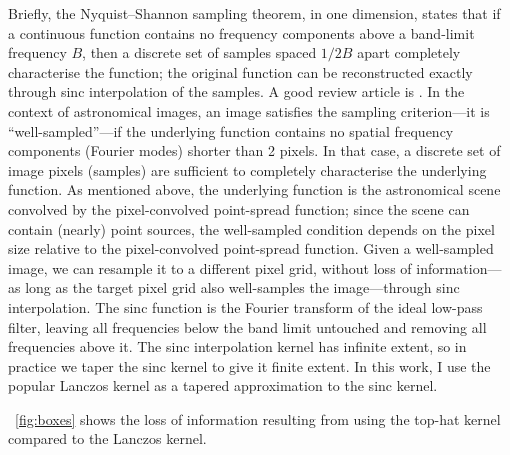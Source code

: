 \documentclass[11pt,preprint]{aastex}
\newcommand{\figref}[1]{\figurename~\ref{#1}}
\newcommand{\Figref}[1]{\figref{#1}}
\begin{document}
Briefly, the Nyquist--Shannon sampling theorem, in one dimension,
states that if a continuous function contains no frequency components
above a band-limit frequency $B$, then a discrete set of samples
spaced $1/2B$ apart completely characterise the function; the original
function can be reconstructed exactly through sinc interpolation of the
samples.  A good review article is \cite{jerri}.
%
In the context of astronomical images, an image satisfies the sampling
criterion---it is ``well-sampled''---if the underlying function
contains no spatial frequency components (Fourier modes) shorter than
2 pixels.  In that case, a discrete set of image pixels (samples) are
sufficient to completely characterise the underlying function.  As
mentioned above, the underlying function is the astronomical scene
convolved by the pixel-convolved point-spread function; since the
scene can contain (nearly) point sources, the well-sampled condition
depends on the pixel size relative to the pixel-convolved point-spread
function.
%
Given a well-sampled image, we can resample it to a different pixel
grid, without loss of information---as long as the target pixel grid
also well-samples the image---through sinc interpolation.  The sinc
function is the Fourier transform of the ideal low-pass filter,
leaving all frequencies below the band limit untouched and removing
all frequencies above it.  The sinc interpolation kernel has infinite
extent, so in practice we taper the sinc kernel to give it finite
extent.  In this work, I use the popular Lanczos kernel as a tapered
approximation to the sinc kernel.


\Figref{fig:boxes} shows the loss of information resulting from
using the top-hat kernel compared to the Lanczos kernel.
\end{document}
